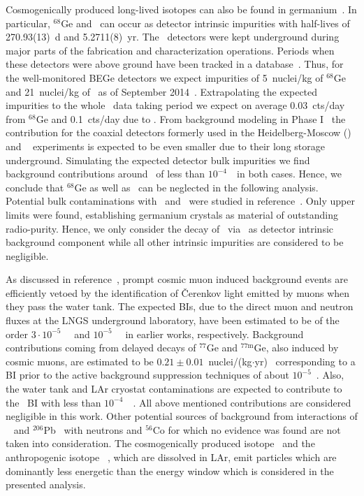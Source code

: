 Cosmogenically produced long-lived isotopes can also be found in
germanium~\cite{Meierhofer2009, Meierhofer2010, Meierhofer2012}. In particular, $^{68}$Ge
and \Co\ can occur as detector intrinsic impurities with half-lives of 270.93(13)~d and
5.2711(8)~yr.  The \bege\ detectors were kept underground during major parts of the
fabrication and characterization operations. Periods when these detectors were above
ground have been tracked in a database~\cite{Agostini2015e}.  Thus, for the well-monitored
BEGe detectors we expect impurities of 5~nuclei/kg of $^{68}$Ge and 21~nuclei/kg of \Co\
as of September 2014~\cite{Agostini2015e}. Extrapolating the expected impurities to the
whole \phasetwo\ data taking period we expect on average 0.03~cts/day from $^{68}$Ge and
0.1~cts/day due to \Co. From background modeling in Phase I~\cite{Agostini2013a} the
contribution for the coaxial detectors formerly used in the Heidelberg-Moscow
(\hdm)~\cite{Klapdor2001} and \igex~\cite{Aalseth2002} experiments is expected to be even
smaller due to their long storage underground. Simulating the expected detector bulk
impurities we find background contributions around \qbb\ of less than $10^{-4}$~\ctsper\
in both cases. Hence, we conclude that $^{68}$Ge as well as \Co\ can be neglected in the
following analysis. Potential bulk contaminations with \Uh\ and \Thh\ were studied in
reference~\cite{Agostini2016a}. Only upper limits were found, establishing germanium
crystals as material of outstanding radio-purity.  Hence, we only consider the decay of
\gesix\ via \nnbb\ as detector intrinsic background component while all other intrinsic
impurities are considered to be negligible.

As discussed in reference~\cite{Agostini2013a}, prompt cosmic muon induced background
events are efficiently vetoed by the identification of \v{C}erenkov light emitted by muons
when they pass the water tank. The expected BIs, due to the direct muon and neutron fluxes
at the LNGS underground laboratory, have been estimated to be of the order
$3\cdot10^{-5}$~\ctsper~\cite{Freund2014} and $10^{-5}$~\ctsper~\cite{Meierhofer2012} in
earlier works, respectively.  Background contributions coming from delayed decays of
$^{77}$Ge and $^{77\text{m}}$Ge, also induced by cosmic muons, are estimated to be
$0.21\pm0.01$~nuclei/(kg$\cdot$yr)~\cite{Wiesinger2018} corresponding to a BI prior to the
active background suppression techniques of about $10^{-5}$~\ctsper. Also, the water tank
and LAr cryostat contaminations are expected to contribute to the \gerda\ BI with less
than $10^{-4}$~\ctsper~\cite{Ackermann2012, Barabanov2009}. All above mentioned
contributions are considered negligible in this work. Other potential sources of
background from interactions of \gesix~\cite{Meierhofer2012, Vanhoefen2018} and
$^{206}$Pb~\cite{Mei2007} with neutrons and $^{56}$Co for which no evidence was found are
not taken into consideration. The cosmogenically produced isotope \Arl\ and the
anthropogenic isotope \Kr~\cite{Winger2005}, which are dissolved in LAr, emit particles
which are dominantly less energetic than the energy window which is considered in the
presented analysis.

